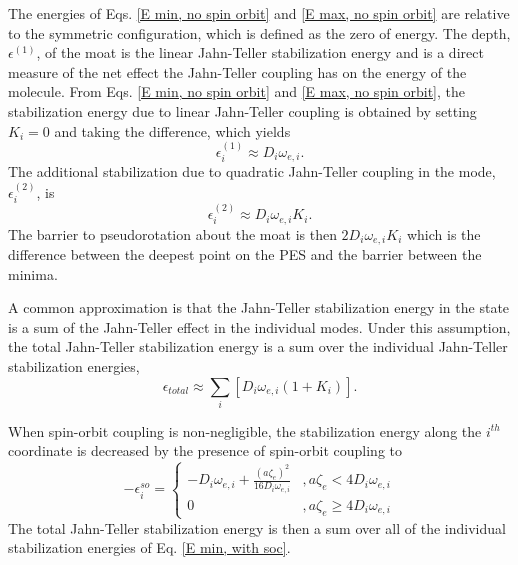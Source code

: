 \documentclass{article}
\begin{document}
The energies of Eqs. \ref{E min, no spin orbit} and \ref{E
max, no spin orbit} are relative to the symmetric configuration, which 
is defined as the zero of energy. The depth, $\epsilon ^{(1)}$, of the moat is the
linear Jahn-Teller stabilization energy and is a direct measure of the net
effect the Jahn-Teller coupling has on the energy of the
molecule. From Eqs. \ref{E min, no spin orbit} and \ref{E max,
  no spin orbit}, the stabilization energy due to linear Jahn-Teller
coupling is obtained by setting $K_i=0$ and taking the difference,
which yields
\begin{equation}
\epsilon _i^{(1)} \approx D_i \omega _{e,i}. 
\label{def of epsilon1}
\end{equation}
The additional stabilization due to quadratic Jahn-Teller coupling in
the mode, $\epsilon _i^{(2)}$, is
\begin{equation}
\epsilon _i^{(2)} \approx D_i \omega _{e,i} K_i. \label{def of epsilon2}
\end{equation}
The barrier to pseudorotation about the moat is then $2D_i \omega
_{e,i} K_i$ which is the difference between the deepest point on the PES and the barrier between the minima.

A common approximation is that the Jahn-Teller stabilization 
energy in the state is a sum of the Jahn-Teller effect in the individual 
modes. Under this assumption, the total Jahn-Teller stabilization energy
is a sum over the individual Jahn-Teller stabilization energies,
\begin{equation}
\epsilon _{total} \approx \sum\limits _i \left[ D_i \omega _{e,i} 
\left( 1 + K_i \right) \right] .
\end{equation}

When spin-orbit coupling is non-negligible, the stabilization energy 
along the $i^{th}$ coordinate is decreased by the presence of spin-orbit
coupling to\cite{barckholtz}
\begin{equation}
-\epsilon _i^{so}=
\left\{ 
\begin{array}{ll}
-D_{i}\omega _{e,i}+\frac{\left( a\zeta _{e}\right) ^{2}}{16D_{i}\omega
_{e,i}} & ,a\zeta _{e}<4D_{i}\omega _{e,i} \\ 
0 & ,a\zeta _{e}\geq 4D_{i}\omega _{e,i}
\end{array} 
\right.  \label{E min, with soc} 
\end{equation}
The total Jahn-Teller stabilization energy is then a sum over all of
the individual stabilization energies of Eq. \ref{E min, with soc}.
\end{document}
